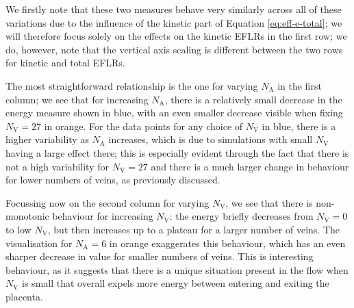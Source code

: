 
            We firstly note that these two measures behave very similarly across all of these variations due to the influence of the kinetic part of Equation \eqref{eq:eff-e-total}; we will therefore focus solely on the effects on the kinetic EFLRs in the first row; we do, however, note that the vertical axis scaling is different between the two rows for kinetic and total EFLRs.

            The most straightforward relationship is the one for varying $N_\text{A}$ in the first column; we see that for increasing $N_\text{A}$, there is a relatively small decrease in the energy measure shown in blue, with an even smaller decrease visible when fixing $N_\text{V} = 27$ in orange. For the data points for any choice of $N_\text{V}$ in blue, there is a higher variability as $N_\text{A}$ increases, which is due to simulations with small $N_\text{V}$ having a large effect there; this is especially evident through the fact that there is not a high variability for $N_\text{V} = 27$ and there is a much larger change in behaviour for lower numbers of veins, as previously discussed.

            Focussing now on the second column for varying $N_\text{V}$, we see that there is non-monotonic behaviour for increasing $N_\text{V}$: the energy briefly decreases from $N_\text{V} = 0$ to low $N_\text{V}$, but then increases up to a plateau for a larger number of veins. The visualisation for $N_\text{A} = 6$ in orange exaggerates this behaviour, which has an even sharper decrease in value for smaller numbers of veins. This is interesting behaviour, as it suggests that there is a unique situation present in the flow when $N_\text{V}$ is small that overall expels more energy between entering and exiting the placenta.
            
